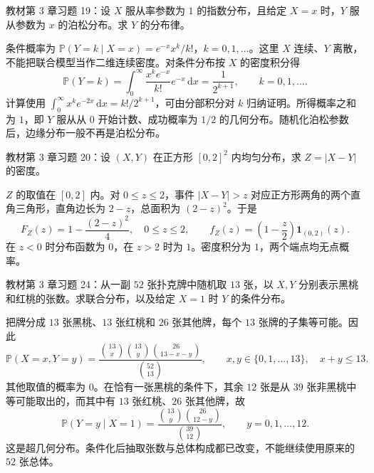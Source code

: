 \begin{example}
\label{ex:study-ch3-exercise-19}
教材第 3 章习题 19：设 $X$ 服从率参数为 $1$ 的指数分布，且给定 $X=x$ 时，$Y$ 服从参数为 $x$ 的泊松分布。求 $Y$ 的分布律。
\end{example}

\begin{solve}
条件概率为 $\mathbb P(Y=k\mid X=x)=e^{-x}x^k/k!$，$k=0,1,\ldots$。这里 $X$ 连续、$Y$ 离散，不能把联合模型当作二维连续密度。对条件分布按 $X$ 的密度积分得
\[
  \mathbb P(Y=k)=\int_0^\infty\frac{x^ke^{-x}}{k!}e^{-x}\,\mathrm dx
  =\frac1{2^{k+1}},\qquad k=0,1,\ldots.
\]
计算使用 $\int_0^\infty x^ke^{-2x}\,\mathrm dx=k!/2^{k+1}$，可由分部积分对 $k$ 归纳证明。所得概率之和为 $1$，即 $Y$ 服从从 $0$ 开始计数、成功概率为 $1/2$ 的几何分布。随机化泊松参数后，边缘分布一般不再是泊松分布。
\end{solve}

\begin{example}
\label{ex:study-ch3-exercise-20}
教材第 3 章习题 20：设 $(X,Y)$ 在正方形 $[0,2]^2$ 内均匀分布，求 $Z=|X-Y|$ 的密度。
\end{example}

\begin{solve}
$Z$ 的取值在 $[0,2]$ 内。对 $0\le z\le2$，事件 $|X-Y|>z$ 对应正方形两角的两个直角三角形，直角边长为 $2-z$，总面积为 $(2-z)^2$。于是
\[
  F_Z(z)=1-\frac{(2-z)^2}{4},\quad0\le z\le2,
  \qquad
  f_Z(z)=\left(1-\frac z2\right)\boldsymbol 1_{(0,2)}(z).
\]
在 $z<0$ 时分布函数为 $0$，在 $z>2$ 时为 $1$。密度积分为 $1$，两个端点均无点概率。
\end{solve}

\begin{example}
\label{ex:study-ch3-exercise-24}
教材第 3 章习题 24：从一副 $52$ 张扑克牌中随机取 $13$ 张，以 $X,Y$ 分别表示黑桃和红桃的张数。求联合分布，以及给定 $X=1$ 时 $Y$ 的条件分布。
\end{example}

\begin{solve}
把牌分成 $13$ 张黑桃、$13$ 张红桃和 $26$ 张其他牌，每个 $13$ 张牌的子集等可能。因此
\[
  \mathbb P(X=x,Y=y)
  =\frac{\binom{13}x\binom{13}y\binom{26}{13-x-y}}{\binom{52}{13}},
  \qquad x,y\in\{0,1,\ldots,13\},\quad x+y\le13.
\]
其他取值的概率为 $0$。在恰有一张黑桃的条件下，其余 $12$ 张是从 $39$ 张非黑桃中等可能取出的，而其中有 $13$ 张红桃、$26$ 张其他牌，故
\[
  \mathbb P(Y=y\mid X=1)
  =\frac{\binom{13}y\binom{26}{12-y}}{\binom{39}{12}},
  \qquad y=0,1,\ldots,12.
\]
这是超几何分布。条件化后抽取张数与总体构成都已改变，不能继续使用原来的 $52$ 张总体。
\end{solve}

